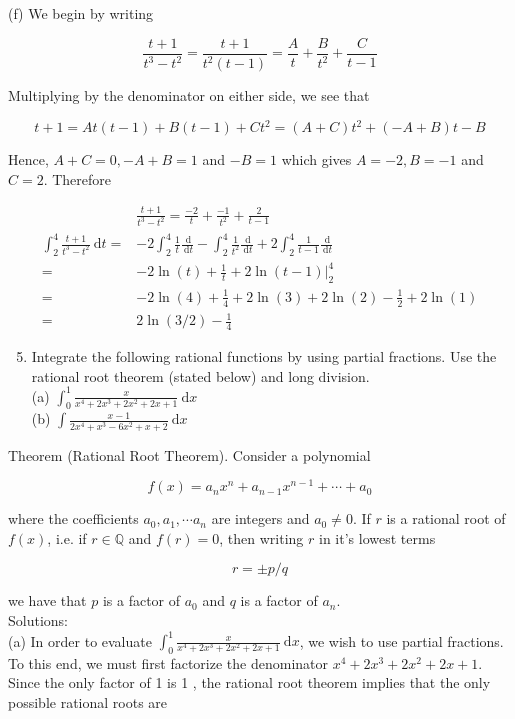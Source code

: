 \documentclass[10pt]{article}
\begin{document}
(f) We begin by writing

$$
\frac{t+1}{t^{3}-t^{2}}=\frac{t+1}{t^{2}(t-1)}=\frac{A}{t}+\frac{B}{t^{2}}+\frac{C}{t-1}
$$

Multiplying by the denominator on either side, we see that

$$
t+1=A t(t-1)+B(t-1)+C t^{2}=(A+C) t^{2}+(-A+B) t-B
$$

Hence, $A+C=0,-A+B=1$ and $-B=1$ which gives $A=-2, B=-1$ and $C=2$. Therefore

$$
\begin{aligned}
& \frac{t+1}{t^{3}-t^{2}}=\frac{-2}{t}+\frac{-1}{t^{2}}+\frac{2}{t-1} \\
\int_{2}^{4} \frac{t+1}{t^{3}-t^{2}} \mathrm{~d} t= & -2 \int_{2}^{4} \frac{1}{t} \frac{\mathrm{~d}}{\mathrm{~d} t}-\int_{2}^{4} \frac{1}{t^{2}} \frac{\mathrm{~d}}{\mathrm{~d} t}+2 \int_{2}^{4} \frac{1}{t-1} \frac{\mathrm{~d}}{\mathrm{~d} t} \\
= & -2 \ln (t)+\frac{1}{t}+\left.2 \ln (t-1)\right|_{2} ^{4} \\
= & -2 \ln (4)+\frac{1}{4}+2 \ln (3)+2 \ln (2)-\frac{1}{2}+2 \ln (1) \\
= & 2 \ln (3 / 2)-\frac{1}{4}
\end{aligned}
$$

\begin{enumerate}
  \setcounter{enumi}{4}
  \item Integrate the following rational functions by using partial fractions. Use the rational root theorem (stated below) and long division.\\
(a) $\int_{0}^{1} \frac{x}{x^{4}+2 x^{3}+2 x^{2}+2 x+1} \mathrm{~d} x$\\
(b) $\int \frac{x-1}{2 x^{4}+x^{3}-6 x^{2}+x+2} \mathrm{~d} x$
\end{enumerate}

Theorem (Rational Root Theorem). Consider a polynomial

$$
f(x)=a_{n} x^{n}+a_{n-1} x^{n-1}+\cdots+a_{0}
$$

where the coefficients $a_{0}, a_{1}, \cdots a_{n}$ are integers and $a_{0} \neq 0$. If $r$ is a rational root of $f(x)$, i.e. if $r \in \mathbb{Q}$ and $f(r)=0$, then writing $r$ in it's lowest terms

$$
r= \pm p / q
$$

we have that $p$ is a factor of $a_{0}$ and $q$ is a factor of $a_{n}$.\\
Solutions:\\
(a) In order to evaluate $\int_{0}^{1} \frac{x}{x^{4}+2 x^{3}+2 x^{2}+2 x+1} \mathrm{~d} x$, we wish to use partial fractions. To this end, we must first factorize the denominator $x^{4}+2 x^{3}+2 x^{2}+2 x+1$. Since the only factor of 1 is 1 , the rational root theorem implies that the only possible rational roots are
\end{document}
